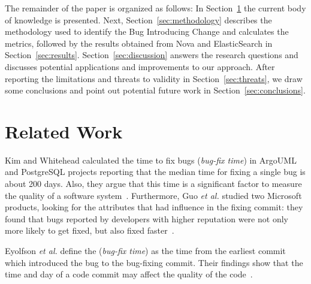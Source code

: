 \documentclass[10pt, conference]{IEEEtran}
\begin{document}

The remainder of the paper is organized as follows: In Section~\ref{sec:relatedwork} the current body of knowledge is presented. Next, Section~\ref{sec:methodology} describes the methodology used to identify the Bug Introducing Change and calculates the metrics, followed by the results obtained from Nova and ElasticSearch in Section~\ref{sec:results}. Section~\ref{sec:discussion} answers the research questions and discusses potential applications and improvements to our approach. After reporting the limitations and threats to validity in Section~\ref{sec:threats}, we draw some conclusions and point out potential future work in Section~\ref{sec:conclusions}.

\section{Related Work}
\label{sec:relatedwork}


Kim and Whitehead calculated the time to fix bugs (\emph{bug-fix time}) in ArgoUML and PostgreSQL projects reporting that the median time for fixing a single bug is about 200 days. Also, they argue that this time is a significant factor to measure the quality of a software system~\cite{kim2006long}. Furthermore, Guo \emph{et al.} studied two Microsoft products, looking for the attributes that had influence in the fixing commit: they found that bugs reported by developers with higher reputation were not only more likely to get fixed, but also fixed faster~\cite{guo2010characterizing}.

Eyolfson \emph{et al.} define the (\emph{bug-fix time}) as the time from the earliest commit which introduced the bug to the bug-fixing commit. Their findings show that the time and day of a code commit may affect the quality of the code~\cite{eyolfson2011time}.
\end{document}
